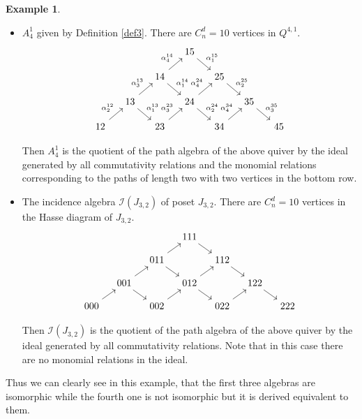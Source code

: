 \documentclass{amsart}
\newcommand{\I}{\mathcal{I}}
\theoremstyle{plain}
\theoremstyle{definition}
\newtheorem{Ex}[Thm]{Example}
\numberwithin{equation}{section}
\begin{document}
\begin{Ex}
\begin{itemize}
\item $A_4^1$ given by Definition \ref{def3}. There are $C_n^d=10$ vertices in $Q^{4,1}$.
\[\begin{tikzcd}[row sep=1.2em, column sep=1.2em]
	&&& 15 &&& \\
	&& 14 && 25 \\
	& 13 && 24 && 35 \\
	12 && 23 && 34 && 45
	\arrow["{\alpha_1^{15}}", from=1-4, to=2-5]
	\arrow["{\alpha_4^{14}}", from=2-3, to=1-4]
	\arrow["{\alpha_1^{14}}", from=2-3, to=3-4]
	\arrow["{\alpha_2^{25}}", from=2-5, to=3-6]
	\arrow["{\alpha_3^{13}}", from=3-2, to=2-3]
	\arrow["{\alpha_1^{13}}", from=3-2, to=4-3]
	\arrow["{\alpha_4^{24}}", from=3-4, to=2-5]
	\arrow["{\alpha_2^{24}}", from=3-4, to=4-5]
	\arrow["{\alpha_3^{35}}", from=3-6, to=4-7]
	\arrow["{\alpha_2^{12}}", from=4-1, to=3-2]
	\arrow["{\alpha_3^{23}}", from=4-3, to=3-4]
	\arrow["{\alpha_4^{34}}", from=4-5, to=3-6]
\end{tikzcd}\]

Then $A_4^1$ is the quotient of the path algebra of the above quiver by the ideal generated by all commutativity relations and the monomial relations corresponding to the paths of length two with two vertices in the bottom row. 

\item The incidence algebra $\I(J_{3,2})$ of poset $J_{3,2}$. There are $C_n^d=10$ vertices in the Hasse diagram of $J_{3,2}$.
\[\begin{tikzcd}[row sep=1em, column sep=1em]
	&&& 111 &&& \\
	&& 011 && 112 \\
	& 001 && 012 && 122 \\
	000 && 002 && 022 && 222
	\arrow[from=1-4, to=2-5]
	\arrow[from=2-3, to=1-4]
	\arrow[from=2-3, to=3-4]
	\arrow[from=2-5, to=3-6]
	\arrow[from=3-2, to=2-3]
	\arrow[from=3-2, to=4-3]
	\arrow[from=3-4, to=2-5]
	\arrow[from=3-4, to=4-5]
	\arrow[from=3-6, to=4-7]
	\arrow[from=4-1, to=3-2]
	\arrow[from=4-3, to=3-4]
	\arrow[from=4-5, to=3-6]
\end{tikzcd}\]

Then $\I(J_{3,2})$ is the quotient of the path algebra of the above quiver by the ideal generated by all commutativity relations. Note that in this case there are no monomial relations in the ideal. 
\end{itemize} 

Thus we can clearly see in this example, that the first three  algebras are isomorphic while the fourth one is not isomorphic but it is derived equivalent to them. 
\end{Ex}
\end{document}

